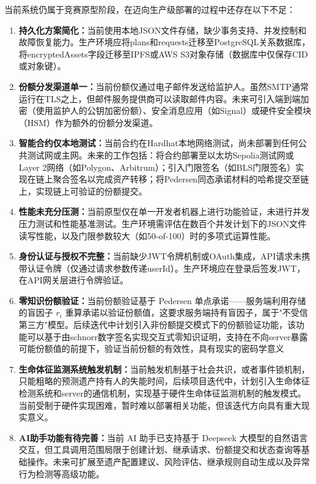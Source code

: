 \documentclass[UTF8,a4paper,zihao=-4,openany]{ctexrep}
\begin{document}
当前系统仍属于竞赛原型阶段，在迈向生产级部署的过程中还存在以下不足：

\begin{enumerate}
  \item \textbf{持久化方案简化：}当前使用本地JSON文件存储，缺少事务支持、并发控制和故障恢复能力。生产环境应将plans和requests迁移至PostgreSQL关系数据库，将encryptedAssets字段迁移至IPFS或AWS S3对象存储（数据库中仅保存CID或对象键）。
  \item \textbf{份额分发渠道单一：}当前份额仅通过电子邮件发送给监护人。虽然SMTP通常运行在TLS之上，但邮件服务提供商可以读取邮件内容。未来可引入端到端加密（使用监护人的公钥加密份额）、安全消息应用（如Signal）或硬件安全模块（HSM）作为额外的份额分发渠道。
  \item \textbf{智能合约仅本地测试：}当前合约在Hardhat本地网络测试，尚未部署到任何公共测试网或主网。未来的工作包括：将合约部署至以太坊Sepolia测试网或Layer 2网络（如Polygon、Arbitrum）；引入门限签名（如BLS门限签名）实现在链上聚合签名以完成资产转移；将Pedersen同态承诺材料的哈希提交至链上，实现链上可验证的份额提交。
  \item \textbf{性能未充分压测：}当前原型仅在单一开发者机器上进行功能验证，未进行并发压力测试和性能基准测试。生产环境需评估在数百个并发计划下的JSON文件读写性能，以及门限参数较大（如50-of-100）时的多项式运算性能。
  \item \textbf{身份认证与授权不完整：}当前缺少JWT令牌机制或OAuth集成，API请求未携带认证令牌（仅通过请求参数传递userId）。生产环境应在登录后签发JWT，在API网关层进行令牌验证。
  \item \textbf{零知识份额验证：}当前份额验证基于 Pedersen 单点承诺——服务端利用存储的盲因子 $r_i$ 重算承诺以验证份额值，这要求服务端持有盲因子，属于"不受信第三方"模型。后续迭代中计划引入非份额提交模式下的份额验证功能，该功能可以基于由schnorr数字签名实现交互式零知识证明，支持在不向server暴露可能份额值的前提下，验证当前份额的有效性，具有现实的密码学意义
  \item \textbf{生命体征监测系统触发机制：}当前触发机制基于社会共识，或者事件锁机制，只能粗略的预测遗产持有人的失能时间，后续项目迭代中，计划引入生命体征检测系统和server的通信机制，实现基于硬件生命体征监测机制的触发模式。当前受制于硬件实现困难，暂时难以部署相关功能，但该迭代方向具有重大现实意义。
  \item \textbf{AI助手功能有待完善：}当前 AI 助手已支持基于 Deepseek 大模型的自然语言交互，但工具调用范围局限于创建计划、继承请求、份额提交和状态查询等基础操作。未来可扩展至遗产配置建议、风险评估、继承规则自动生成以及异常行为检测等高级功能。
\end{enumerate}
\end{document}
